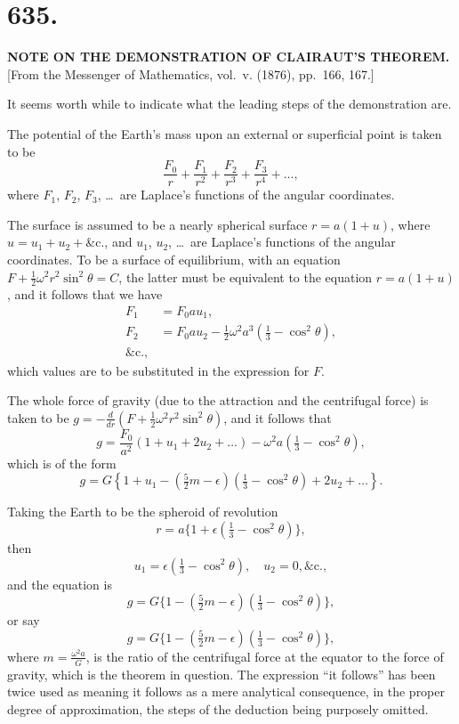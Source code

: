 \documentclass[11pt,a4paper]{book}
\begin{document}
\clearpage
\setcounter{page}{17}

\section*{635.}

\begin{center}
\textbf{NOTE ON THE DEMONSTRATION OF CLAIRAUT'S THEOREM.}\\[1em]
[From the Messenger of Mathematics, vol.~v. (1876), pp.~166, 167.]
\end{center}

It seems worth while to indicate what the leading steps of the demonstration are.

The potential of the Earth's mass upon an external or superficial point is taken to be
\[
\frac{F_0}{r} + \frac{F_1}{r^2} + \frac{F_2}{r^3} + \frac{F_3}{r^4} + \ldots,
\]
where $F_1$, $F_2$, $F_3$, \ldots\ are Laplace's functions of the angular coordinates.

The surface is assumed to be a nearly spherical surface $r = a(1 + u)$, where $u = u_1 + u_2 + \&\text{c.}$, and $u_1$, $u_2$, \ldots\ are Laplace's functions of the angular coordinates. To be a surface of equilibrium, with an equation $F + \frac{1}{2}\omega^2 r^2 \sin^2\theta = C$, the latter must be equivalent to the equation $r = a(1+u)$, and it follows that we have
\begin{align*}
F_1 &= F_0 a u_1, \\
F_2 &= F_0 a u_2 - \tfrac{1}{2}\omega^2 a^3 \left(\tfrac{1}{3} - \cos^2\theta\right), \\
\&\text{c.},
\end{align*}
which values are to be substituted in the expression for $F$.

The whole force of gravity (due to the attraction and the centrifugal force) is taken to be $g = -\frac{d}{dr}\left(F + \frac{1}{2}\omega^2 r^2 \sin^2\theta\right)$, and it follows that
\[
g = \frac{F_0}{a^2}(1 + u_1 + 2u_2 + \ldots) - \omega^2 a \left(\tfrac{1}{3} - \cos^2\theta\right),
\]
which is of the form
\[
g = G\left\{1 + u_1 - \left(\tfrac{5}{2}m - \epsilon\right)\left(\tfrac{1}{3} - \cos^2\theta\right) + 2u_2 + \ldots\right\}.
\]

Taking the Earth to be the spheroid of revolution
\[
r = a\{1 + \epsilon(\tfrac{1}{3} - \cos^2\theta)\},
\]
then
\[
u_1 = \epsilon(\tfrac{1}{3} - \cos^2\theta), \quad u_2 = 0, \&\text{c.},
\]
and the equation is
\[
g = G\{1 - (\tfrac{5}{2}m - \epsilon)(\tfrac{1}{3} - \cos^2\theta)\},
\]
or say
\[
g = G\{1 - (\tfrac{5}{2}m - \epsilon)(\tfrac{1}{3} - \cos^2\theta)\},
\]
where $m = \frac{\omega^2 a}{G}$, is the ratio of the centrifugal force at the equator to the force of gravity, which is the theorem in question. The expression ``it follows'' has been twice used as meaning it follows as a mere analytical consequence, in the proper degree of approximation, the steps of the deduction being purposely omitted.
\end{document}
